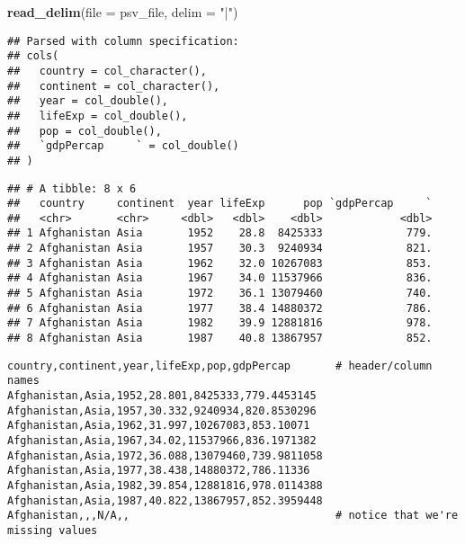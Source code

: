 \documentclass[
]{book}
\newenvironment{Shaded}{\begin{snugshade}}{\end{snugshade}}
\newcommand{\DataTypeTok}[1]{\textcolor[rgb]{0.13,0.29,0.53}{#1}}
\newcommand{\KeywordTok}[1]{\textcolor[rgb]{0.13,0.29,0.53}{\textbf{#1}}}
\newcommand{\NormalTok}[1]{#1}
\newcommand{\StringTok}[1]{\textcolor[rgb]{0.31,0.60,0.02}{#1}}
\begin{document}
\begin{Shaded}
\begin{Highlighting}[]
\KeywordTok{read_delim}\NormalTok{(}\DataTypeTok{file =}\NormalTok{ psv_file, }\DataTypeTok{delim =} \StringTok{"|"}\NormalTok{)}
\end{Highlighting}
\end{Shaded}

\begin{verbatim}
## Parsed with column specification:
## cols(
##   country = col_character(),
##   continent = col_character(),
##   year = col_double(),
##   lifeExp = col_double(),
##   pop = col_double(),
##   `gdpPercap     ` = col_double()
## )
\end{verbatim}

\begin{verbatim}
## # A tibble: 8 x 6
##   country     continent  year lifeExp      pop `gdpPercap     `
##   <chr>       <chr>     <dbl>   <dbl>    <dbl>            <dbl>
## 1 Afghanistan Asia       1952    28.8  8425333             779.
## 2 Afghanistan Asia       1957    30.3  9240934             821.
## 3 Afghanistan Asia       1962    32.0 10267083             853.
## 4 Afghanistan Asia       1967    34.0 11537966             836.
## 5 Afghanistan Asia       1972    36.1 13079460             740.
## 6 Afghanistan Asia       1977    38.4 14880372             786.
## 7 Afghanistan Asia       1982    39.9 12881816             978.
## 8 Afghanistan Asia       1987    40.8 13867957             852.
\end{verbatim}

\begin{verbatim}
country,continent,year,lifeExp,pop,gdpPercap       # header/column names
Afghanistan,Asia,1952,28.801,8425333,779.4453145
Afghanistan,Asia,1957,30.332,9240934,820.8530296
Afghanistan,Asia,1962,31.997,10267083,853.10071
Afghanistan,Asia,1967,34.02,11537966,836.1971382
Afghanistan,Asia,1972,36.088,13079460,739.9811058
Afghanistan,Asia,1977,38.438,14880372,786.11336
Afghanistan,Asia,1982,39.854,12881816,978.0114388
Afghanistan,Asia,1987,40.822,13867957,852.3959448
Afghanistan,,,N/A,,                                # notice that we're missing values
\end{verbatim}
\end{document}
